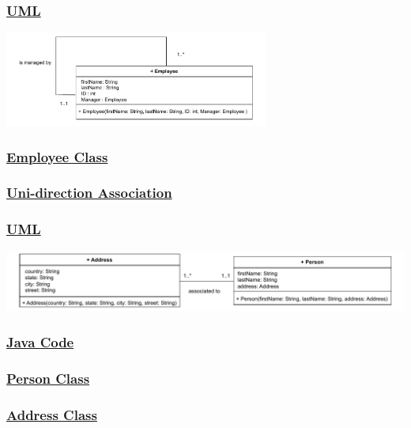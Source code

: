 \subsubsection*{\underline{UML}}

\begin{center}
\includegraphics[width=0.65\textwidth]{Chapters/Diagram/OOP/EX2/ex2.a.drawio.pdf}
\end{center}


\subsubsection*{\underline{Employee Class}}



\subsubsection*{\underline{Uni-direction Association}}
\subsubsection*{\underline{UML}}

\includegraphics[width=\textwidth]{Chapters/Diagram/OOP/EX2/ex2.b.drawio.pdf}

\subsubsection*{\underline{Java Code}}

\subsubsection*{\underline{Person Class}}


\newpage
\subsubsection*{\underline{Address Class}}


